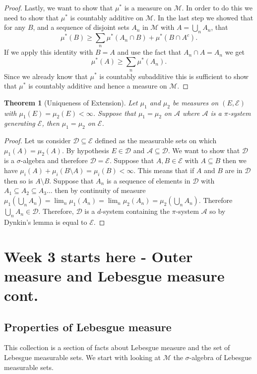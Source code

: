 \documentclass[11pt]{article}
\newtheorem{thm}{Theorem}[section]
\theoremstyle{definition}
\theoremstyle{remark}
\begin{document}
\begin{proof}
Lastly, we want to show that $\mu^*$ is a measure on $\mathscr{M}$. In order to do this we need to show that $\mu^*$ is countably additive on $\mathscr{M}$. In the last step we showed that for any $B$, and a sequence of disjoint sets $A_n$ in $\mathscr{M}$ with $A= \bigcup_n A_n$, that
\[ \mu^*(B) \geq \sum_n \mu^*(A_n \cap B) + \mu^*(B \cap A^c). \] If we apply this identity with $B=A$ and use the fact that $A_n \cap A = A_n$ we get
\[ \mu^*(A) \geq \sum_n \mu^*(A_n). \] Since we already know that $\mu^*$ is countably subadditive this is sufficient to show that $\mu^*$ is countably additive and hence a measure on $\mathscr{M}$.
\end{proof}

\begin{thm}[Uniqueness of Extension]
Let $\mu_1$ and $\mu_2$ be measures on $(E,\mathcal{E})$ with $\mu_1(E) = \mu_2(E) < \infty$. Suppose that $\mu_1 = \mu_2$ on $\mathcal{A}$ where $\mathcal{A}$ is a $\pi$-system generating $\mathcal{E}$, then $\mu_1 = \mu_2$ on $\mathcal{E}$.
\end{thm}
\begin{proof}
Let us consider $\mathcal{D} \subseteq \mathcal{E}$ defined as the measurable sets on which $\mu_1(A) = \mu_2(A)$. By hypothesis $E \in \mathcal{D}$ and $\mathcal{A} \subseteq \mathcal{D}$. We want to show that $\mathcal{D}$ is a $\sigma$-algebra and therefore $\mathcal{D} = \mathcal{E}$. Suppose that $A, B \in \mathcal{E}$ with $A \subseteq B$ then we have $\mu_i(A) + \mu_i (B \setminus A) = \mu_i(B) < \infty.$ This means that if $A$ and $B$ are in $\mathcal{D}$ then so is $A \setminus B$.  Suppose that $A_n$ is a sequence of elements in $\mathcal{D}$ with $A_1 \subseteq A_2 \subseteq A_3 \dots$ then by continuity of measure $\mu_1(\bigcup_n A_n) = \lim_n \mu_1(A_n) = \lim_n \mu_2(A_n) = \mu_2(\bigcup_n A_n)$. Therefore $\bigcup_n A_n \in \mathcal{D}$. Therefore, $\mathcal{D}$ is a $d$-system containing the $\pi$-system $\mathcal{A}$ so by Dynkin's lemma is equal to $\mathcal{E}$.
\end{proof}


\section{Week 3 starts here - Outer measure and Lebesgue measure cont.}
\subsection{Properties of Lebesgue measure}
This collection is a section of facts about Lebesgue measure and the set of Lebesgue measurable sets. We start with looking at $\mathscr{M}$ the $\sigma$-algebra of Lebesgue measurable sets. 
\end{document}
